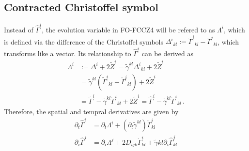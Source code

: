 \subsection*{Contracted Christoffel symbol}
Instead of $\hat\Gamma^i$, the evolution variable in FO-FCCZ4 will be refered to as $\Lambda^i$,
which is defined via the difference of the Christoffel symbols
$\Delta^i{}_{kl} := \tilde{\Gamma}^{i}{}_{kl} - \mathring{\Gamma}^{i}{}_{kl}$,
which transforms like a vector. Its relationship to $\hat{\Gamma}^i$ can be derived as
\begin{equation}
\begin{aligned}
\Lambda^i &:= \Delta^i + 2 \tilde Z^i
= \tilde{\gamma}^{kl}\Delta^i{}_{kl} + 2 \tilde Z^i \\
&= \tilde{\gamma}^{kl}(\tilde{\Gamma}^{i}{}_{kl} - \mathring{\Gamma}^{i}{}_{kl}) + 2 \tilde Z^i \\
&= \tilde{\Gamma}^{i} - \tilde{\gamma}^{kl}\mathring{\Gamma}^{i}{}_{kl} + 2 \tilde Z^i
= \hat{\Gamma}^{i} - \tilde{\gamma}^{kl}\mathring{\Gamma}^{i}{}_{kl}
\,.
\end{aligned}
\end{equation}
Therefore, the spatial and tempral derivatives are given by
\begin{align}
\partial_t \hat{\Gamma}^i &= \partial_t \Lambda^i + (\partial_t \tilde{\gamma}^{kl}) \mathring{\Gamma}^i_{kl} \\
\partial_i \hat{\Gamma}^j &= \partial_i \Lambda^j + 2D_{ijk} \mathring{\Gamma}^i_{kl}
  + \tilde\gamma{kl} \partial_i \hat{\Gamma}^j_{kl}
\end{align}
